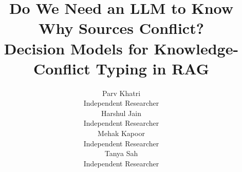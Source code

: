 \documentclass[11pt,a4paper]{article}
\title{Do We Need an LLM to Know Why Sources Conflict?\\
Decision Models for Knowledge-Conflict Typing in RAG}
\author{
  Parv Khatri \\ Independent Researcher \\ \authoremail{khatriparv@gmail.com}
  \And
  Harshul Jain \\ Independent Researcher \\ \authoremail{harshuljain1393@gmail.com}
  \AND
  Mehak Kapoor \\ Independent Researcher \\ \authoremail{mehakkapoor9873@gmail.com}
  \And
  Tanya Sah \\ Independent Researcher \\ \authoremail{tanyasah20@gmail.com}
}
\date{}
\begin{document}
\maketitle

\begin{abstract}

\end{abstract}













\appendix

\end{document}

